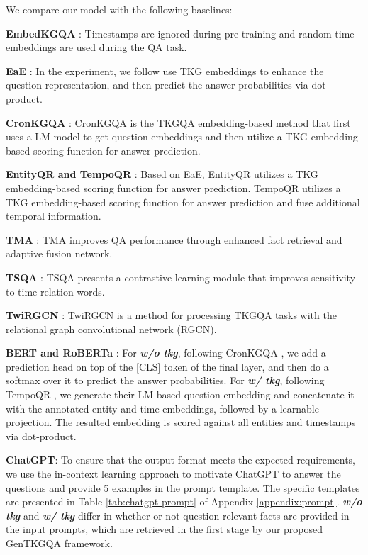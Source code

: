 \documentclass[11pt]{article}
\begin{document}
We compare our model with the following baselines:

\textbf{EmbedKGQA} \cite{EmbeddedKGQA}:
Timestamps are ignored during pre-training and random time embeddings are used during the QA task.

\textbf{EaE} \cite{EaE}: 
In the experiment, we follow use TKG embeddings to enhance the question representation, and then predict the answer probabilities via dot-product.

\textbf{CronKGQA} \cite{cronqa}: 
CronKGQA is the TKGQA embedding-based method that first uses a LM model to get question embeddings and then utilize a TKG embedding-based scoring function for answer prediction.

\textbf{EntityQR and TempoQR} \cite{tempoqa}: 
Based on EaE, EntityQR utilizes a TKG embedding-based scoring function for answer prediction.
TempoQR utilizes a TKG embedding-based scoring function for answer prediction and fuse additional temporal information.

\textbf{TMA} \cite{TMA}:
TMA improves QA performance through enhanced fact retrieval and adaptive fusion network.

\textbf{TSQA} \cite{TSQA}:
TSQA presents a contrastive learning module that improves sensitivity to time relation words.

\textbf{TwiRGCN} \cite{TwiRGCN}: 
TwiRGCN is a method for processing TKGQA tasks with the relational graph convolutional network (RGCN).

\textbf{BERT and RoBERTa} \cite{BERT,roberta}: 
For \textbf{\textit{w/o tkg}}, following CronKGQA \cite{cronqa}, we add a prediction head on top of the [CLS] token of the final layer, and then do a softmax over it to predict the answer probabilities.
For \textbf{\textit{w/ tkg}}, following TempoQR \cite{tempoqa}, we generate their LM-based question embedding and concatenate it with the annotated entity and time embeddings, followed by a learnable projection. The resulted embedding is scored against all entities and timestamps via dot-product.

\textbf{ChatGPT}:
To ensure that the output format meets the expected requirements, we use the in-context learning approach to motivate ChatGPT to answer the questions and provide 5 examples in the prompt template. 
The specific templates are presented in Table \ref{tab:chatgpt prompt} of Appendix \ref{appendix:prompt}. 
\textbf{\textit{w/o tkg}} and \textbf{\textit{w/ tkg}} differ in whether or not question-relevant facts are provided in the input prompts, which are retrieved in the first stage by our proposed GenTKGQA framework.
\end{document}
